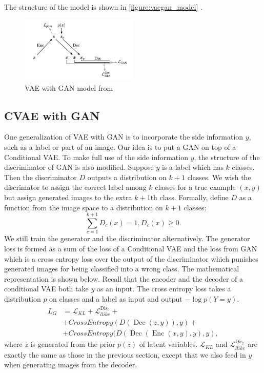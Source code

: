 \documentclass[10pt]{article}
\newcommand{\op}[1]{\operatorname{#1}}
\begin{document}
The structure of the model is shown in \autoref{figure:vaegan_model} \cite{larsen2015autoencoding}.

\begin{figure}[!ht]\centering
\includegraphics[width=0.5\textwidth]{images/vaegan2.png}
\caption{VAE with GAN model from \cite{larsen2015autoencoding}}
\label{figure:vaegan_model}
\end{figure}

\subsection{CVAE with GAN}
One generalization of VAE with GAN is to incorporate the side information $y$, such as a label or part of an image. Our idea is to put a GAN on top of a Conditional VAE. To make full use of the side information $y$, the structure of the discriminator of GAN is also modified. Suppose $y$ is a label which has $k$ classes. Then the discriminator $D$ outputs a distribution on $k+1$ classes. We wish the discrimator to assign the correct label among $k$ classes for a true example $(x,y)$ but assign generated images to the extra $k+1$th class. Formally, define $D$ as a function from the image space to a distribution on $k+1$ classes:
$$
\sum_{c=1}^{k+1} D_c(x) = 1, D_c(x) \geq 0.
$$
We still train the generator and the discriminator alternatively. The generator loss is formed as a sum of the loss of a Conditional VAE and the loss from GAN which is a cross entropy loss over the output of the discriminator which punishes generated images for being classified into a wrong class. The mathematical representation is shown below. Recall that the encoder and the decoder of a conditional VAE both take $y$ as an input. The cross entropy loss takes a distribution $p$ on classes and a label as input and output $-\log p(Y=y)$.
\begin{align}
L_G &= \mathcal{L}_{KL} + \mathcal{L}_{llike}^{\op{Dis}_l}+ \\
&+CrossEntropy(D(\op{Dec}(z,y)),y)+ \\
&+CrossEntropy(D(\op{Dec}(\op{Enc}(x,y),y),y),
\end{align}
where $z$ is generated from the prior $p(z)$ of latent variables. $\mathcal{L}_{KL}$ and $\mathcal{L}_{llike}^{\op{Dis}_l}$ are exactly the same as those in the previous section, except that we also feed in $y$ when generating images from the decoder. 
\end{document}
